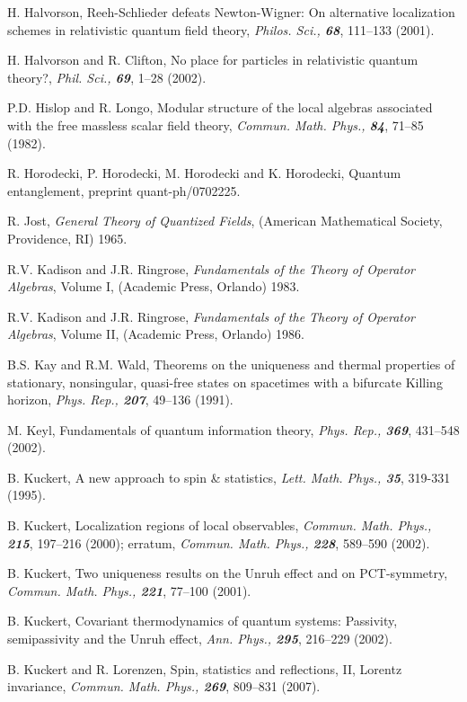 \documentclass[12pt]{article}
\begin{document}
\begin{thebibliography}{Bor}
H. Halvorson, Reeh-Schlieder defeats Newton-Wigner: On alternative 
localization schemes in relativistic quantum field theory, {\sl Philos. Sci., 
\bf 68}, 111--133 (2001). 

H. Halvorson and R. Clifton, No place for particles in relativistic
quantum theory?, {\sl Phil. Sci., \bf 69}, 1--28 (2002).

P.D. Hislop and R. Longo, Modular structure of the local algebras
associated with the free massless scalar field theory, {\sl Commun. Math.
Phys., \bf 84}, 71--85 (1982).

R. Horodecki, P. Horodecki, M. Horodecki and K. Horodecki, Quantum
entanglement, preprint quant-ph/0702225.

R. Jost, {\it General Theory of Quantized Fields}, (American 
Mathematical Society, Providence, RI) 1965.

R.V. Kadison and J.R. Ringrose, {\it Fundamentals of the
Theory of Operator Algebras}, Volume I, (Academic Press, Orlando)
1983.

R.V. Kadison and J.R. Ringrose, {\it Fundamentals of the 
Theory of Operator Algebras}, Volume II, (Academic Press, Orlando) 1986.

B.S. Kay and R.M. Wald, Theorems on the uniqueness and thermal 
properties of stationary, nonsingular, quasi-free states on spacetimes with
a bifurcate Killing horizon, {\sl Phys. Rep., \bf 207}, 49--136 (1991).

M. Keyl, Fundamentals of quantum information theory, {\sl Phys.
Rep., \bf 369}, 431--548 (2002).

B. Kuckert, A new approach to spin \& statistics, {\sl Lett. Math.
Phys., \bf 35}, 319-331 (1995). 

B. Kuckert, Localization regions of local observables, {\sl
Commun. Math. Phys., \bf 215}, 197--216 (2000); erratum, {\sl
Commun. Math. Phys., \bf 228}, 589--590 (2002).

B. Kuckert, Two uniqueness results on the Unruh effect and on
PCT-symmetry, {\sl Commun. Math. Phys., \bf 221}, 77--100 (2001).

B. Kuckert, Covariant thermodynamics of quantum systems: Passivity,
semipassivity and the Unruh effect, {\sl Ann. Phys., \bf 295}, 216--229
(2002).

B. Kuckert and R. Lorenzen, Spin, statistics and reflections, II,
Lorentz invariance, {\sl Commun. Math. Phys., \bf 269}, 809--831 (2007). 


\end{thebibliography}
\end{document}

